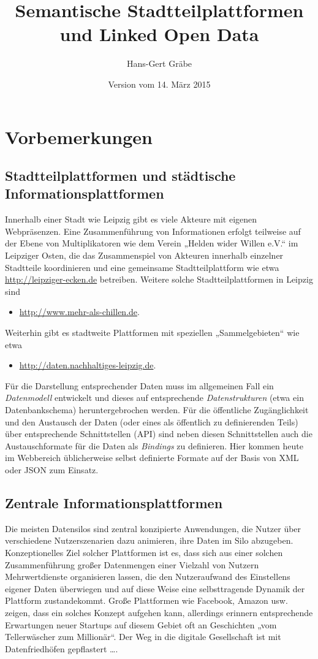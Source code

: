\documentclass[a4paper,11pt]{article}
\title{Semantische Stadtteilplattformen und Linked Open Data}
\author{Hans-Gert Gräbe}
\date{Version vom 14. März 2015}
\begin{document}
\maketitle
\tableofcontents 

\section{Vorbemerkungen}

\subsection{Stadtteilplattformen und städtische Informationsplattformen}

Innerhalb einer Stadt wie Leipzig gibt es viele Akteure mit eigenen
Webpräsenzen.  Eine Zusammenführung von Informationen erfolgt teilweise auf der
Ebene von Multiplikatoren wie dem Verein „Helden wider Willen e.V.“ im
Leipziger Osten, die das Zusammenspiel von Akteuren innerhalb einzelner
Stadtteile koordinieren und eine gemeinsame Stadtteilplattform wie etwa
\url{http://leipziger-ecken.de} betreiben.  Weitere solche Stadtteilplattformen
in Leipzig sind
\begin{itemize}
\item \url{http://www.mehr-als-chillen.de}.
\end{itemize}
Weiterhin gibt es stadtweite Plattformen mit speziellen „Sammelgebieten“ wie
etwa 
\begin{itemize}
\item \url{http://daten.nachhaltiges-leipzig.de}.
\end{itemize}

Für die Darstellung entsprechender Daten muss im allgemeinen Fall ein
\emph{Datenmodell} entwickelt und dieses auf entsprechende
\emph{Datenstrukturen} (etwa ein Datenbankschema) heruntergebrochen werden.
Für die öffentliche Zugänglichkeit und den Austausch der Daten (oder eines als
öffentlich zu definierenden Teils) über entsprechende Schnittstellen (API) sind
neben diesen Schnittstellen auch die Austauschformate für die Daten als
\emph{Bindings} zu definieren. Hier kommen heute im Webbereich üblicherweise
selbst definierte Formate auf der Basis von XML oder JSON zum Einsatz.

\subsection{Zentrale Informationsplattformen}

Die meisten Datensilos sind zentral konzipierte Anwendungen, die Nutzer über
verschiedene Nutzerszenarien dazu animieren, ihre Daten im Silo abzugeben.
Konzeptionelles Ziel solcher Plattformen ist es, dass sich aus einer solchen
Zusammenführung großer Datenmengen einer Vielzahl von Nutzern Mehrwertdienste
organisieren lassen, die den Nutzeraufwand des Einstellens eigener Daten
überwiegen und auf diese Weise eine selbsttragende Dynamik der Plattform
zustandekommt. Große Plattformen wie Facebook, Amazon usw. zeigen, dass ein
solches Konzept aufgehen kann, allerdings erinnern entsprechende Erwartungen
neuer Startups auf diesem Gebiet oft an Geschichten „vom Tellerwäscher zum
Millionär“. Der Weg in die digitale Gesellschaft ist mit Datenfriedhöfen
gepflastert {\ldots}.
\end{document}
